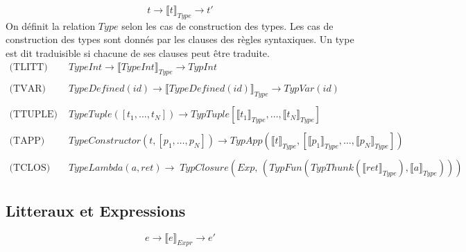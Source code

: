 \documentclass[
  12pt,
]{article}
\begin{document}
\[  t \rightarrow \llbracket t \rrbracket_{Type} \rightarrow t' \] On définit la relation
\({Type}\) selon les cas de construction des types. Les cas de
construction des types sont donnés par les clauses des règles
syntaxiques. Un type est dit traduisible si chacune de ses clauses peut
être traduite.
\begin{align*}
  \text{(TLITT) }               & TypeInt \rightarrow \llbracket TypeInt \rrbracket_{Type}  \rightarrow TypInt                   \\    
  \\
  \text{(TVAR) }               & TypeDefined(id) \rightarrow \llbracket TypeDefined(id) \rrbracket_{Type} \rightarrow TypVar(id)    \\ \\              
  \text{(TTUPLE) } & TypeTuple([t_1,\dots, t_N]) \rightarrow  TypTuple[\llbracket t_1 \rrbracket_{Type},\dots,\llbracket t_N \rrbracket_{Type}]            \\
  \\
  \text{(TAPP) }  & TypeConstructor(t, [p_1,\dots,p_N]) \rightarrow  TypApp(\llbracket t \rrbracket_{Type}, [\llbracket p_1 \rrbracket_{Type},\dots,\llbracket p_N \rrbracket_{Type}]) \\
  \\
  \text{(TCLOS) }            & TypeLambda(a,ret)                                                  
  \rightarrow \;               TypClosure(Exp, \, (TypFun(TypThunk(\llbracket ret \rrbracket_{Type}), \llbracket a \rrbracket_{Type})))
\end{align*}
\subsection{Litteraux et Expressions}\label{litteraux-et-expressions}

\[ e \rightarrow \llbracket e \rrbracket_{Expr} \rightarrow e'  \]
\end{document}
